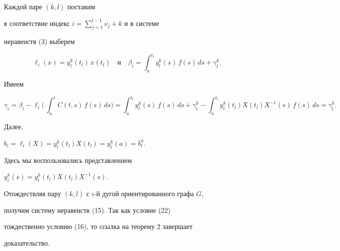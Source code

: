 \begin{pf} Каждой паре $(k,l)$ поставим


в соответствие индекс $i=\sum\limits_{j=1}^{l-1}\nu_j+k$ и в системе


неравенств (3) выберем


$$


\ell_i(x)=y_l^k(t_l)\,x(t_l)\quad


\text{и} \quad


\beta_i=\int_a^{t_l}y_l^k(s)\,f(s)\,ds+\gamma_l^k.


$$


Имеем


$$


\gamma_i=\beta_i-\ell_i\bigg(\,\int_a^t C(t,s)\,f(s)\,ds\bigg)=


\int_a^{t_l}y_l^k(s)\,f(s)\,ds+\gamma_l^k-


\int_a^{t_l}y_l^k(t_l)X(t_l)X^{-1}(s)\,f(s)\,ds=\gamma_l^k.


$$


Далее,


$b_i=\ell_i(X)=y_l^k(t_l)X(t_l)=y_l^k(a)=b_l^k$.


Здесь мы воспользовались представлением


$y_l^k(s)=y_l^k(t_l)X(t_l)X^{-1}(s)$.


Отождествляя пару $(k,l)$ с $i$-й дугой ориентированного графа $G$,


получим систему неравенств (15). Так как условие (22)


тождественно условию (16), то ссылка на теорему 2 завершает


доказательство.


\end{pf}





